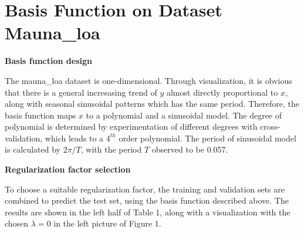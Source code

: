 \documentclass{article} %
\begin{document}
\vspace{0.4cm}
\section*{Basis Function on Dataset Mauna\_loa} %

\textbf{Basis function design}

  The mauna\_loa dataset is one-dimensional. Through visualization, it is obvious that there is a general incresasing trend of $y$ almost directly proportional to $x$, along with seasonal sinusoidal patterns which has the same period. Therefore, the basis function maps $x$ to a polynomial and a sinusoidal model. The degree of polynomial is determined by experimentation of different degrees with cross-validation, which leads to a $4^{th}$ order polynomial. The period of sinusoidal model is calculated by $2\pi / T$, with the period $T$ observed to be 0.057.

\textbf{Regularization factor selection}

  To choose a suitable regularization factor, the training and validation sets are combined to predict the test set, using the basis function described above. The results are shown in the left half of Table 1, along with a visualization with the chosen $\lambda = 0$ in the left picture of Figure 1.
\end{document}
